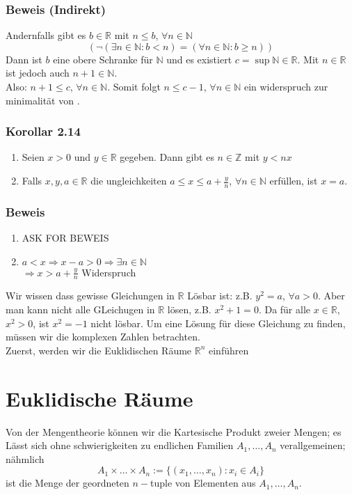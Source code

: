 \subsubsection*{Beweis (Indirekt)}
Andernfalls gibt es $b\in\mathbb{R}$ mit $n\leq b$, $\forall n\in\mathbb{N}$ $$\left( \lnot\left(\exists n\in\mathbb{N}:b<n\right)=\left(\forall n\in\mathbb{N}:b\geq n\right)\right)$$
Dann ist $b$ eine obere Schranke für $\mathbb{N}$ und es existiert $c=\sup\mathbb{N}\in\mathbb{R}$. Mit $n\in\mathbb{R}$ ist jedoch auch $n+1\in\mathbb{N}$.\\
Also: $n+1\leq c$, $\forall n\in\mathbb{N}$. Somit folgt $n\leq c-1$, $\forall n\in\mathbb{N}$ ein widerspruch zur minimalität von .

\subsubsection*{Korollar 2.14}
\begin{enumerate}
    \item Seien $x>0$ und $y\in\mathbb{R}$ gegeben. Dann gibt es $n\in\mathbb{Z}$ mit $y<nx$
    \item Falls $x,y,a\in\mathbb{R}$ die ungleichkeiten $a\leq x\leq a+\frac{y}{n}$, $\forall n\in\mathbb{N}$ erfüllen, ist $x=a$.
\end{enumerate}
\subsubsection*{Beweis}

\begin{enumerate}
    \item ASK FOR BEWEIS
    \item $a<x\Rightarrow x-a>0\Rightarrow \exists n\in\mathbb{N}$\\
$\Rightarrow x>a+\frac{y}{n}$ Widerspruch
\end{enumerate}
Wir wissen dass gewisse Gleichungen in $\mathbb{R}$ Lösbar ist: z.B. $y^2=a$, $\forall a>0$. Aber man kann nicht alle GLeichugen in $\mathbb{R}$ lösen, z.B. $x^2+1=0$. Da für alle $x\in\mathbb{R}$, $x^2>0$, ist $x^2=-1$ nicht lösbar. Um eine Lösung für diese Gleichung zu finden, müssen wir die komplexen Zahlen betrachten.\\

\noindent Zuerst, werden wir die Euklidischen Räume $\mathbb{R}^n$ einführen
\section{Euklidische Räume}
Von der Mengentheorie können wir die Kartesische Produkt zweier Mengen; es Lässt sich ohne schwierigkeiten zu endlichen Familien $A_1,\dots ,A_n$ verallgemeinen; nähmlich $$A_1\times\dots\times A_n:=\{\left(x_1,\dots ,x_n\right):x_i\in A_i \}$$ ist die Menge der geordneten $n-$tuple von Elementen aus $A_1,\dots ,A_n$.\\

